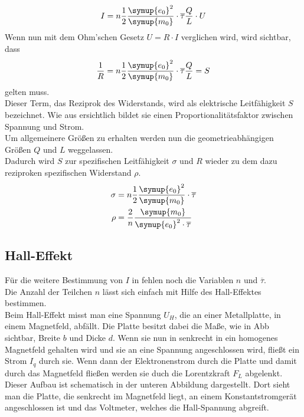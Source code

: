 \begin{equation}
  I=n\frac{1}{2}\frac{\symup{e_0}^2}{\symup{m_0}}\cdot \overline{\tau} \frac{Q}{L} \cdot U
  \label{eqn:ohm1}
\end{equation}
Wenn nun  mit dem Ohm'schen Gesetz $U=R\cdot I$ verglichen wird, wird sichtbar, dass 
\begin{equation}
  \frac{1}{R}=n\frac{1}{2}\frac{\symup{e_0}^2}{\symup{m_0}}\cdot \overline{\tau} \frac{Q}{L} = S\nonumber
\end{equation}
gelten muss.\\
Dieser Term, das Reziprok des Widerstands, wird als elektrische Leitfähigkeit $S$ bezeichnet. Wie aus  ersichtlich bildet
sie einen Proportionalitätsfaktor zwischen Spannung und Strom.\\
Um allgemeinere Größen zu erhalten werden nun die geometrieabhängigen Größen $Q$ und $L$ weggelassen.\\
Dadurch wird $S$ zur spezifischen Leitfähigkeit $\sigma$ und $R$ wieder zu dem dazu reziproken spezifischen Widerstand $\rho$.
\begin{align}
  \sigma&=n\frac{1}{2}\frac{\symup{e_0}^2}{\symup{m_0}} \cdot \overline{\tau} \label{eqn:sigma}\\
  \rho &=\frac{2}{n}\frac{\symup{m_0}}{\symup{e_0}^2 \cdot \overline{\tau}}  \label{eqn:rho}
\end{align}



\subsection{Hall-Effekt}

Für die weitere Bestimmung von $I$ in  fehlen noch die Variablen $n$ und $\overline{\tau}$.\\
Die Anzahl der Teilchen $n$ lässt sich einfach mit Hilfe des Hall-Effektes bestimmen.\\
Beim Hall-Effekt misst man eine Spannung $U_H$, die an einer Metallplatte, in einem Magnetfeld, abfällt.
Die Platte besitzt dabei die Maße, wie in Abb  sichtbar, Breite $b$ und Dicke $d$.
Wenn sie nun in senkrecht in ein homogenes Magnetfeld gehalten wird und sie an eine Spannung angeschlossen wird, fließt ein Strom $I_q$ durch sie.
Wenn dann der Elektronenstrom durch die Platte und damit durch das Magnetfeld fließen werden sie duch die Lorentzkraft $F_L$ abgelenkt.\\
Dieser Aufbau ist schematisch in der unteren Abbildung  dargestellt. Dort sieht man die Platte, die senkrecht im Magnetfeld liegt, 
an einem Konstantstromgerät angeschlossen ist und das Voltmeter, welches die Hall-Spannung abgreift. 




